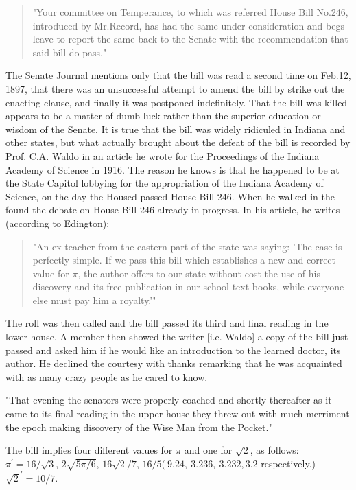 \begin{quote}
   "Your committee on Temperance, to which was referred House Bill No.246,
introduced by Mr.Record, has had the same under consideration and begs leave
to report the same back to the Senate with the recommendation that said bill
do pass."
\end{quote}

The Senate Journal mentions only that the bill was read a second time on
Feb.12, 1897, that there was an unsuccessful attempt to amend the bill
by strike out the enacting clause, and finally it was postponed indefinitely.
That the bill was killed appears to be a matter of dumb luck rather than the
superior education or wisdom of the Senate. It is true that the bill was
widely ridiculed in Indiana and other states, but what actually brought about
the defeat of the bill is recorded by Prof. C.A. Waldo in an article he wrote
for the Proceedings of the Indiana Academy of Science in 1916. The reason
he knows is that he happened to be at the State Capitol lobbying for the
appropriation of the Indiana Academy of Science, on the day the Housed passed
House Bill 246. When he walked in the found the debate on House Bill 246
already in progress. In his article, he writes (according to Edington):

\begin{quote}
"An ex-teacher from the eastern part of the state was saying: 'The case is
perfectly simple. If we pass this bill which establishes a new and correct
value for $\pi$, the author offers to our state without cost the use of his
discovery and its free publication in our school text books, while everyone
else must pay him a royalty.'"
\end{quote}

 The roll was then called and the bill passed its
third and final reading in the lower house. A member then showed the writer
[i.e. Waldo] a copy of the bill just passed and asked him if he would like
an introduction to the learned doctor, its author. He declined the courtesy
with thanks remarking that he was acquainted with as many crazy people as he
cared to know.

"That evening the senators were properly coached and shortly thereafter as it
came to its final reading in the upper house they threw out with much
merriment the epoch making discovery of the Wise Man from the Pocket."


The bill implies four different values
for $\pi$ and one for $\sqrt{2}$, as follows:
$\pi^\prime = 16/\sqrt{3}$, $2\sqrt{5\pi/6}$, $16\sqrt{2}/7$, $16/5
    (~9.24     , ~3.236      , ~3.232     , 3.2$ respectively.)
$\sqrt{2}^\prime = 10/7.$

